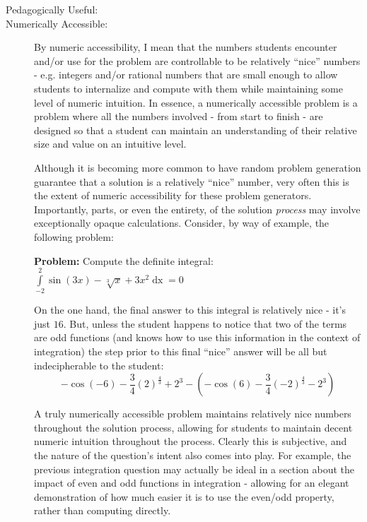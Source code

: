 \documentclass{article}
\DeclareMathOperator{\dx}{dx}
\begin{document}
        \begin{description}
            \item[Pedagogically Useful:]
                
            \item[Numerically Accessible:]
                By numeric accessibility, I mean that the numbers students encounter and/or use for the problem are controllable to be relatively ``nice'' numbers - e.g. integers and/or rational numbers that are small enough to allow students to internalize and compute with them while maintaining some level of numeric intuition. In essence, a numerically accessible problem is a problem where all the numbers involved - from start to finish - are designed so that a student can maintain an understanding of their relative size and value on an intuitive level. 
                
                Although it is becoming more common to have random problem generation guarantee that a solution is a relatively ``nice'' number, very often this is the extent of numeric accessibility for these problem generators. Importantly, parts, or even the entirety, of the solution \textit{process} may involve exceptionally opaque calculations. Consider, by way of example, the following problem:
                
                \textbf{Problem:} Compute the definite integral: $\int\limits_{-2}^2 \sin(3x) - \sqrt[3]{x} + 3x^2 \dx = 0$
                
                On the one hand, the final answer to this integral is relatively nice - it's just $16$. But, unless the student happens to notice that two of the terms are odd functions (and knows how to use this information in the context of integration) the step prior to this final ``nice'' answer will be all but indecipherable to the student: 
                \[
                    -\cos(-6) - \frac{3}{4}(2)^{\frac{4}{3}} + 2^3 - \left(-\cos(6) - \frac{3}{4}(-2)^{\frac{4}{3}} - 2^3\right)
                \]
                
                A truly numerically accessible problem maintains relatively nice numbers throughout the solution process, allowing for students to maintain decent numeric intuition throughout the process. Clearly this is subjective, and the nature of the question's intent also comes into play. For example, the previous integration question may actually be ideal in a section about the impact of even and odd functions in integration - allowing for an elegant demonstration of how much easier it is to use the even/odd property, rather than computing directly. 
                

\end{description}
\end{document}
